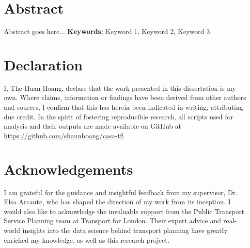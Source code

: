 \chapter*{Abstract}
Abstract goes here...
\newline
\newline
\textbf{Keywords:} Keyword 1, Keyword 2, Keyword 3

\chapter*{Declaration}
I, The-Huan Hoang, declare that the work presented in this dissertation is my own. Where claims, information or findings have been derived from other authors and sources, I confirm that this has herein been indicated in writing, attributing due credit. In the spirit of fostering reproducible research, all scripts used for analysis and their outputs are made available on GitHub at \url{https://github.com/shaunhoang/casa-tfl}.

\chapter*{Acknowledgements}
I am grateful for the guidance and insightful feedback from my supervisor, Dr. Elsa Arcaute, who has shaped the direction of my work from its inception. I would also like to acknowledge the invaluable support from the Public Transport Service Planning team at Transport for London. Their expert advice and real-world insights into the data science behind transport planning have greatly enriched my knowledge, as well as this research project.

\tableofcontents

\listoffigures

\listoftables